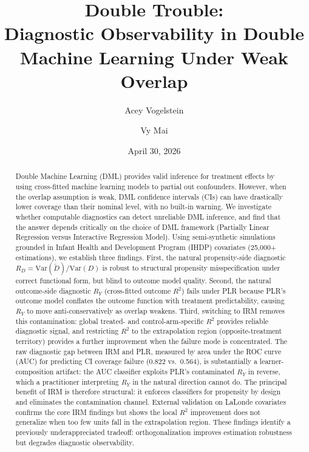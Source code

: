 \documentclass[12pt]{article}
\title{Double Trouble:\\
Diagnostic Observability in Double Machine Learning Under Weak Overlap}
\author{Acey Vogelstein \and Vy Mai}
\date{April 30, 2026}
\begin{document}
\maketitle

\begin{abstract}
Double Machine Learning (DML) provides valid inference for treatment effects by using cross-fitted machine learning models to partial out confounders. However, when the overlap assumption is weak, DML confidence intervals (CIs) can have drastically lower coverage than their nominal level, with no built-in warning. We investigate whether computable diagnostics can detect unreliable DML inference, and find that the answer depends critically on the choice of DML framework (Partially Linear Regression versus Interactive Regression Model). Using semi-synthetic simulations grounded in Infant Health and Development Program (IHDP) covariates (25,000+ estimations), we establish three findings. First, the natural propensity-side diagnostic $R_D = \mathrm{Var}(\tilde{D})/\mathrm{Var}(D)$ is robust to structural propensity misspecification under correct functional form, but blind to outcome model quality. Second, the natural outcome-side diagnostic $R_Y$ (cross-fitted outcome $R^2$) fails under PLR because PLR's outcome model conflates the outcome function with treatment predictability, causing $R_Y$ to move anti-conservatively as overlap weakens. Third, switching to IRM removes this contamination: global treated- and control-arm-specific $R^2$ provides reliable diagnostic signal, and restricting $R^2$ to the extrapolation region (opposite-treatment territory) provides a further improvement when the failure mode is concentrated. The raw diagnostic gap between IRM and PLR, measured by area under the ROC curve (AUC) for predicting CI coverage failure (0.822 vs.\ 0.564), is substantially a learner-composition artifact: the AUC classifier exploits PLR's contaminated $R_Y$ in reverse, which a practitioner interpreting $R_Y$ in the natural direction cannot do. The principal benefit of IRM is therefore structural: it enforces classifiers for propensity by design and eliminates the contamination channel. External validation on LaLonde covariates confirms the core IRM findings but shows the local $R^2$ improvement does not generalize when too few units fall in the extrapolation region. These findings identify a previously underappreciated tradeoff: orthogonalization improves estimation robustness but degrades diagnostic observability.
\end{abstract}
\end{document}
